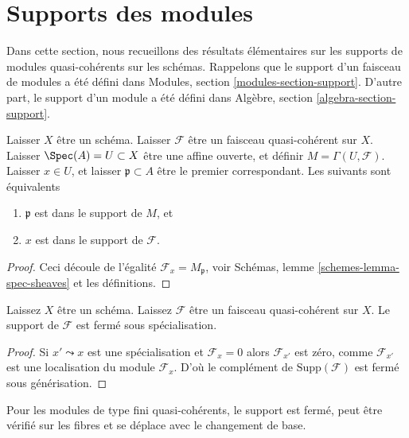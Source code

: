 \section{Supports des modules}
\label{section-support}

\noindent
Dans cette section, nous recueillons des résultats élémentaires sur les supports de modules quasi-cohérents sur les schémas. Rappelons que le support d'un faisceau de modules a été défini dans Modules, section \ref{modules-section-support}. D'autre part, le support d'un module a été défini dans Algèbre, section \ref{algebra-section-support}.

\begin{lemma}

\label{lemma-support-affine-open}
Laisser $X$ être un schéma. Laisser $\mathcal{F}$ être un faisceau quasi-cohérent sur $X$. Laisser $\Spec(A) = U \subset X$ être une affine ouverte, et définir $M = \Gamma(U, \mathcal{F})$. Laisser $x \in U$, et laisser $\mathfrak p \subset A$ être le premier correspondant. Les suivants sont équivalents
\begin{enumerate}
\item $\mathfrak p$ est dans le support de $M$, et
\item $x$ est dans le support de $\mathcal{F}$.
\end{enumerate}

\end{lemma}

\begin{proof}
Ceci découle de l'égalité $\mathcal{F}_x = M_{\mathfrak p}$, voir Schémas, lemme \ref{schemes-lemma-spec-sheaves} et les définitions.
\end{proof}

\begin{lemma}

\label{lemma-support-closed-specialization}
Laissez $X$ être un schéma. Laissez $\mathcal{F}$ être un faisceau quasi-cohérent sur $X$. Le support de $\mathcal{F}$ est fermé sous spécialisation.
\end{lemma}

\begin{proof}
Si $x' \leadsto x$ est une spécialisation et $\mathcal{F}_x = 0$ alors $\mathcal{F}_{x'}$ est zéro, comme $\mathcal{F}_{x'}$ est une localisation du module $\mathcal{F}_x$. D'où le complément de $\text{Supp}(\mathcal{F})$ est fermé sous générisation.
\end{proof}

\noindent
Pour les modules de type fini quasi-cohérents, le support est fermé, peut être vérifié sur les fibres et se déplace avec le changement de base.

